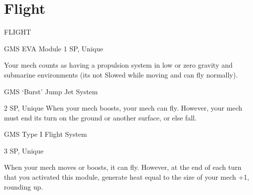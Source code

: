 \section{Flight}

                                                   FLIGHT  

GMS EVA Module  
1 SP, Unique  

Your mech counts as having a propulsion system in low or zero gravity and submarine  
environments (its not Slowed while moving and can fly normally).
 

GMS ‘Burst’ Jump Jet System
 
2 SP, Unique  
When your mech boosts, your mech can fly. However, your mech must end its turn on the  
ground or another surface, or else fall.
 

GMS Type I Flight System  

3 SP, Unique
 
When your mech moves or boosts, it can fly. However, at the end of each turn that you activated  
this module, generate heat equal to the size of your mech +1, rounding up.
 
